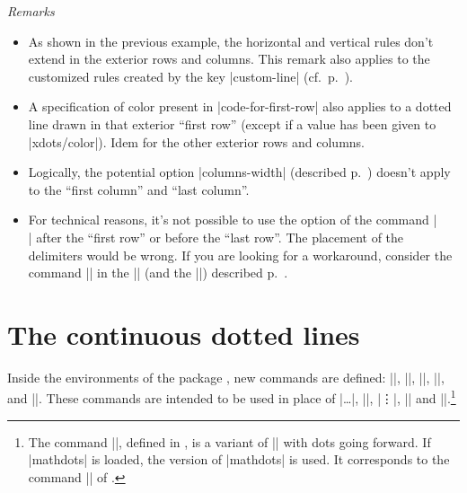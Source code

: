 \documentclass[dvipsnames]{article}%
\begin{document}
\emph{Remarks}
\begin{itemize}[beginpenalty=10000]
\item As shown in the previous example, the horizontal and vertical rules
don't extend in the exterior rows and columns. This remark also applies to the
customized rules created by the key |custom-line|
(cf.~p.~\pageref{custom-line}). 

\item A specification of color present in |code-for-first-row| also applies to
a dotted line drawn in that exterior ``first row'' (except if a value has
been given to |xdots/color|). Idem for the other exterior rows and columns.

\item Logically, the potential option |columns-width| (described
p.~\pageref{width}) doesn't apply to the ``first column'' and ``last column''.

\item For technical reasons, it's not possible to use the option of the
command |\\| after the ``first row'' or before the ``last row''. The placement
of the delimiters would be wrong. If you are looking for a workaround,
consider the command |\SubMatrix| in the |\CodeAfter| (and the |\CodeBefore|)
described p.~\pageref{sub-matrix}. 
\end{itemize}





\section{The continuous dotted lines}

\label{Cdots}

Inside the environments of the package , new commands are
defined: |\Ldots|, |\Cdots|, |\Vdots|, |\Ddots|, and |\Iddots|. These commands
are intended to be used in place of |\dots|, |\cdots|, |\vdots|, |\ddots| and
|\iddots|.\footnote{The command |\iddots|, defined in , is a
variant of |\ddots| with dots going forward. If |mathdots| is loaded, the
version of |mathdots| is used. It corresponds to the command |\adots| of
.} 
\setcounter{fniddots}{\thefootnote}
\end{document}
